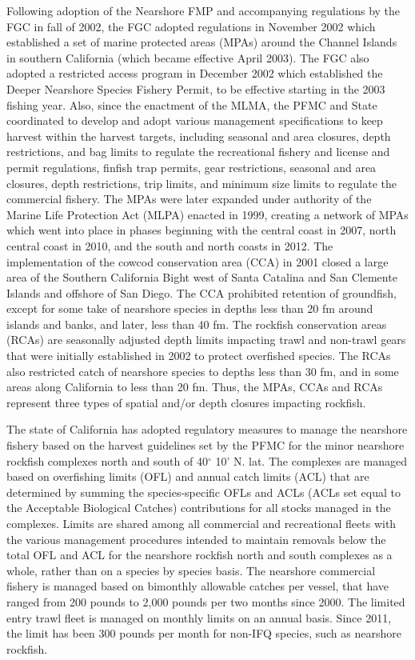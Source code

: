 \documentclass[11pt,
  english,
  letterpaper,
]{article}
\begin{document}
Following adoption of the Nearshore FMP and accompanying regulations by the FGC in fall of 2002, the FGC adopted regulations in November 2002 which established a set of marine protected areas (MPAs) around the Channel Islands in southern California (which became effective April 2003). The FGC also adopted a restricted access program in December 2002 which established the Deeper Nearshore Species Fishery Permit, to be effective starting in the 2003 fishing year. Also, since the enactment of the MLMA, the PFMC and State coordinated to develop and adopt various management specifications to keep harvest within the harvest targets, including seasonal and area closures, depth restrictions, and bag limits to regulate the recreational fishery and license and permit regulations, finfish trap permits, gear restrictions, seasonal and area closures, depth restrictions, trip limits, and minimum size limits to regulate the commercial fishery. The MPAs were later expanded under authority of the Marine Life Protection Act (MLPA) enacted in 1999, creating a network of MPAs which went into place in phases beginning with the central coast in 2007, north central coast in 2010, and the south and north coasts in 2012. The implementation of the cowcod conservation area (CCA) in 2001 closed a large area of the Southern California Bight west of Santa Catalina and San Clemente Islands and offshore of San Diego. The CCA prohibited retention of groundfish, except for some take of nearshore species in depths less than 20 fm around islands and banks, and later, less than 40 fm. The rockfish conservation areas (RCAs) are seasonally adjusted depth limits impacting trawl and non-trawl gears that were initially established in 2002 to protect overfished species. The RCAs also restricted catch of nearshore species to depths less than 30 fm, and in some areas along California to less than 20 fm. Thus, the MPAs, CCAs and RCAs represent three types of spatial and/or depth closures impacting rockfish.

The state of California has adopted regulatory measures to manage the nearshore fishery based on the harvest guidelines set by the PFMC for the minor nearshore rockfish complexes north and south of 40\(^\circ\) 10' N. lat. The complexes are managed based on overfishing limits (OFL) and annual catch limits (ACL) that are determined by summing the species-specific OFLs and ACLs (ACLs set equal to the Acceptable Biological Catches) contributions for all stocks managed in the complexes. Limits are shared among all commercial and recreational fleets with the various management procedures intended to maintain removals below the total OFL and ACL for the nearshore rockfish north and south complexes as a whole, rather than on a species by species basis. The nearshore commercial fishery is managed based on bimonthly allowable catches per vessel, that have ranged from 200 pounds to 2,000 pounds per two months since 2000. The limited entry trawl fleet is managed on monthly limits on an annual basis. Since 2011, the limit has been 300 pounds per month for non-IFQ species, such as nearshore rockfish.
\end{document}
